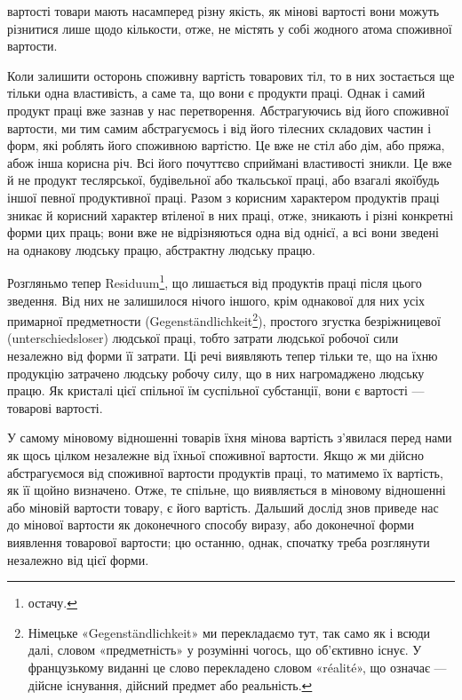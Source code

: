 \parcont{}  %
вартості товари мають насамперед різну якість, як мінові вартості
вони можуть різнитися лише щодо кількости, отже, не
містять у собі жодного атома споживної вартости.

Коли залишити осторонь споживну вартість товарових тіл,
то в них зостається ще тільки одна властивість, а саме та, що
вони є продукти праці. Однак і самий продукт праці вже зазнав
у нас перетворення. Абстрагуючись від його споживної вартости,
ми тим самим абстрагуємось і від його тілесних складових частин
і форм, які роблять його споживною вартістю. Це вже не стіл або
дім, або пряжа, абож інша корисна річ. Всі його почуттєво сприймані
властивості зникли. Це вже й не продукт теслярської, будівельної
або ткальської праці, або взагалі якоїбудь іншої певної
продуктивної праці. Разом з корисним характером продуктів
праці зникає й корисний характер втіленої в них праці, отже,
зникають і різні конкретні форми цих праць; вони вже не відрізняються
одна від однієї, а всі вони зведені на однакову людську
працю, абстрактну людську працю.

Розгляньмо тепер Residuum\footnote*{
остачу. 
}, що лишається від продуктів
праці після цього зведення. Від них не залишилося нічого іншого,
крім однакової для них усіх примарної предметности (Gegenständlichkeit\footnote*{
Німецьке «Gegenständlichkeit» ми перекладаємо тут, так само як
і всюди далі, словом «предметність» у розумінні чогось, що об’єктивно
існує. У французькому виданні це слово перекладено словом «réalité»,
що означає — дійсне існування, дійсний предмет або реальність. 
}),
простого згустка безріжницевої (unterschiedsloser)
людської праці, тобто затрати людської робочої сили незалежно
від форми її затрати. Ці речі виявляють тепер тільки те,
що на їхню продукцію затрачено людську робочу силу, що в них
нагромаджено людську працю. Як кристалі цієї спільної їм суспільної
субстанції, вони є вартості — товарові вартості.

У самому міновому відношенні товарів їхня мінова вартість
з’явилася перед нами як щось цілком незалежне від їхньої споживної
вартости. Якщо ж ми дійсно абстрагуємося від споживної
вартости продуктів праці, то матимемо їх вартість, як її щойно
визначено. Отже, те спільне, що виявляється в міновому відношенні
або міновій вартости товару, є його вартість. Дальший дослід
знов приведе нас до мінової вартости як доконечного способу
виразу, або доконечної форми виявлення товарової вартости; цю
останню, однак, спочатку треба розглянути незалежно від цієї форми.

